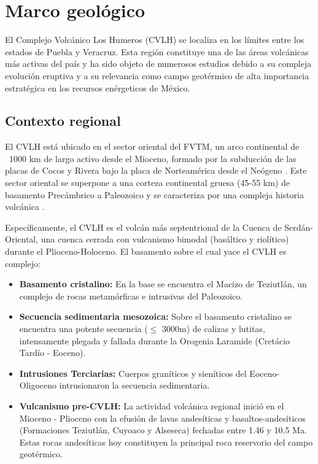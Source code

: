 \chapter{Marco geológico}\label{cap:mg}
El Complejo Volcánico Los Humeros (CVLH) se localiza en los límites entre los estados de Puebla y Veracruz. Esta región constituye una de las áreas volcánicas más activas del país y ha sido objeto de numerosos estudios debido a su compleja evolución eruptiva y a su relevancia como campo geotérmico de alta importancia estratégica en los recursos enérgeticos de México.

\section{Contexto regional}
El CVLH está ubicado en el sector oriental del FVTM, un arco continental de ~1000 km de largo activo desde el Mioceno, formado por la subducción de las placas de Cocos y Rivera bajo la placa de Norteamérica desde el Neógeno \autocite{Bloque1}. Este sector oriental se superpone a una corteza continental gruesa (45-55 km) de basamento Precámbrico a Paleozoico y se caracteriza por una compleja historia volcánica \autocite{Bloque1}.

Específicamente, el CVLH es el volcán más septentrional de la Cuenca de Serdán-Oriental, una cuenca cerrada con vulcanismo bimodal (basáltico y riolítico) durante el Plioceno-Holoceno. El basamento sobre el cual yace el CVLH es complejo:

\begin{itemize}
    \item \textbf{Basamento cristalino:} En la base se encuentra el Macizo de Teziutlán, un complejo de rocas metamórficas e intrusivas del Paleozoico.
    \item \textbf{Secuencia sedimentaria mesozoica:} Sobre el basamento cristalino se encuentra una potente secuencia ($\leq$ 3000m) de calizas y lutitas, intensamente plegada y fallada durante la Orogenia Laramide (Cretácio Tardío - Eoceno).
    \item \textbf{Intrusiones Terciarias:} Cuerpos graníticos y sieníticos del Eoceno-Oligoceno intrusionaron la secuencia sedimentaria.
    \item \textbf{Vulcanismo pre-CVLH:} La actividad volcánica regional inició en el Mioceno - Plioceno con la efusión de lavas andesíticas y basaltos-andesíticos (Formaciones Teziutlán, Cuyoaco y Alseseca) fechadas entre 1.46 y 10.5 Ma. Estas rocas andesíticas hoy constituyen la principal roca reservorio del campo geotérmico.
\end{itemize}

